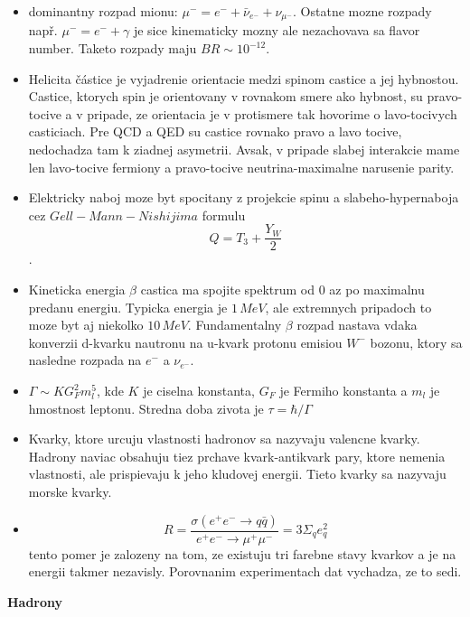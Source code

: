 \documentclass[../../main.tex]{subfiles}
\begin{document}
\begin{itemize}
\item dominantny rozpad mionu: $\mu^-=e^-+\bar{\nu}_{e^-}+\nu_{{\mu}^-}$. Ostatne mozne rozpady např. $\mu^-=e^-+\gamma$ je sice kinematicky mozny ale nezachovava sa flavor number. Taketo rozpady maju $BR\sim10^{-12}$.
\item Helicita částice je vyjadrenie orientacie medzi spinom castice a jej hybnostou. Castice, ktorych spin je orientovany v rovnakom smere ako hybnost, su pravo-tocive a v pripade, ze orientacia je v protismere tak hovorime o lavo-tocivych casticiach. Pre QCD a QED su castice rovnako pravo a lavo tocive, nedochadza tam k ziadnej asymetrii. Avsak, v pripade slabej interakcie mame len lavo-tocive fermiony a pravo-tocive neutrina-maximalne narusenie parity.
\item Elektricky naboj moze byt spocitany z projekcie spinu a slabeho-hypernaboja cez $Gell-Mann-Nishijima$ formulu $$Q=T_3+\frac{Y_W}{2}$$.
\item Kineticka energia $\beta$ castica ma spojite spektrum od 0 az po maximalnu predanu energiu. Typicka energia je $1\,MeV$, ale extremnych pripadoch to moze byt aj niekolko $10\,MeV$. Fundamentalny $\beta$ rozpad nastava vdaka konverzii d-kvarku nautronu na u-kvark protonu emisiou $W^-$ bozonu, ktory sa nasledne rozpada na $e^-$ a $\nu_{e^-}$.
\item $\Gamma\sim KG_F^2m_l^5$, kde $K$ je ciselna konstanta, $G_F$ je Fermiho konstanta a $m_l$ je hmostnost leptonu. Stredna doba zivota je $\tau=\hbar/\Gamma$
\item Kvarky, ktore urcuju vlastnosti hadronov sa nazyvaju valencne kvarky. Hadrony naviac obsahuju tiez prchave kvark-antikvark pary, ktore nemenia vlastnosti, ale prispievaju k jeho kludovej energii. Tieto kvarky sa nazyvaju morske kvarky.
\item $$ R=\frac{\sigma(e^+e^-\rightarrow q\bar{q})}{e^+e^-\rightarrow \mu^+ \mu^-}=3\Sigma_{q}e^2_q$$ tento pomer je zalozeny na tom, ze existuju tri farebne stavy kvarkov a je na energii takmer nezavisly. Porovnanim experimentach dat vychadza, ze to sedi.\newline
\end{itemize}
\textbf{Hadrony}
\end{document}

